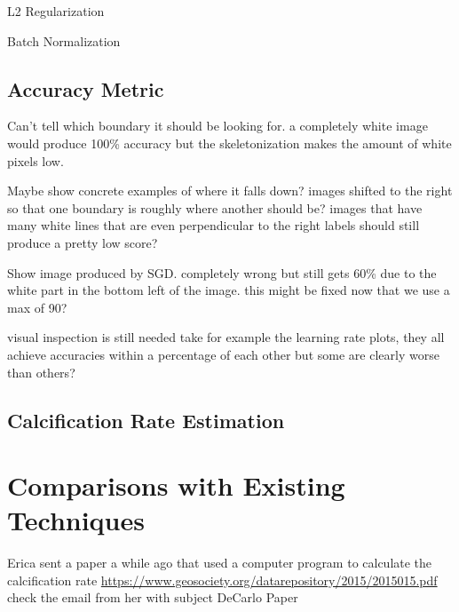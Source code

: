 L2 Regularization

Batch Normalization

\subsection{Accuracy Metric}

Can't tell which boundary it should be looking for. a completely white image would produce 100\% accuracy but the skeletonization makes the amount of white pixels low.

Maybe show concrete examples of where it falls down? images shifted to the right so that one boundary is roughly where another should be? images that have many white lines that are even perpendicular to the right labels should still produce a pretty low score?

Show image produced by SGD. completely wrong but still gets 60\% due to the white part in the bottom left of the image. this might be fixed now that we use a max of 90?

visual inspection is still needed take for example the learning rate plots, they all achieve accuracies within a percentage of each other but some are clearly worse than others?

\subsection{Calcification Rate Estimation}

\section{Comparisons with Existing Techniques}

Erica sent a paper a while ago that used a computer program to calculate the calcification rate  \url{https://www.geosociety.org/datarepository/2015/2015015.pdf} check the email from her with subject DeCarlo Paper





